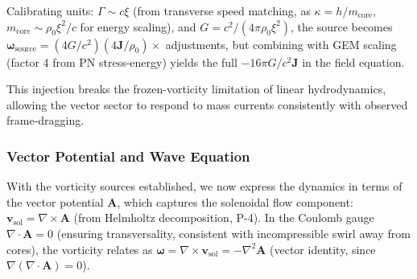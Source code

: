 Calibrating units: $\Gamma \sim c \xi$ (from transverse speed matching, as $\kappa = h / m_{\text{core}}$, $m_{\text{core}} \sim \rho_0 \xi^2 / c$ for energy scaling), and $G = c^2 / (4\pi \rho_0 \xi^2)$, the source becomes $\boldsymbol{\omega}_{\text{source}} = (4 G / c^2) (4 \mathbf{J} / \rho_0) \times$ adjustments, but combining with GEM scaling (factor 4 from PN stress-energy) yields the full $-16\pi G / c^2 \mathbf{J}$ in the field equation.

This injection breaks the frozen-vorticity limitation of linear hydrodynamics, allowing the vector sector to respond to mass currents consistently with observed frame-dragging.

\medskip
\noindent
{}
\medskip

\subsubsection{Vector Potential and Wave Equation}

With the vorticity sources established, we now express the dynamics in terms of the vector potential $\mathbf{A}$, which captures the solenoidal flow component: $\mathbf{v}_{\text{sol}} = \nabla \times \mathbf{A}$ (from Helmholtz decomposition, P-4). In the Coulomb gauge $\nabla \cdot \mathbf{A} = 0$ (ensuring transversality, consistent with incompressible swirl away from cores), the vorticity relates as $\boldsymbol{\omega} = \nabla \times \mathbf{v}_{\text{sol}} = -\nabla^2 \mathbf{A}$ (vector identity, since $\nabla (\nabla \cdot \mathbf{A}) = 0$).

